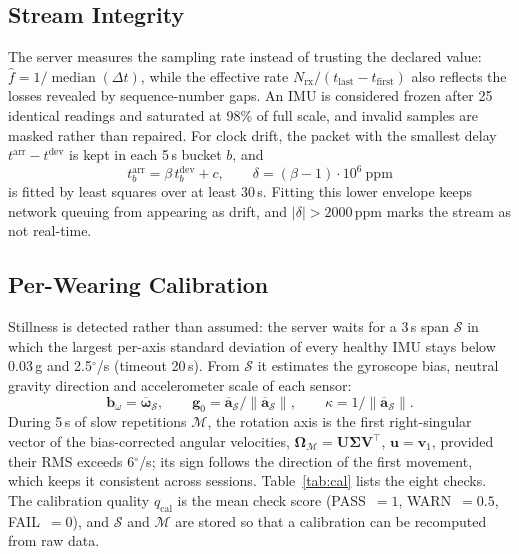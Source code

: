 \documentclass[conference]{IEEEtran}
\newcommand{\vect}[1]{\mathbf{#1}}
\begin{document}
\subsection{Stream Integrity}
The server measures the sampling rate instead of trusting the declared value: $\hat f=1/\operatorname{median}(\Delta t)$, while the effective rate $N_{\mathrm{rx}}/(t_{\mathrm{last}}-t_{\mathrm{first}})$ also reflects the losses revealed by sequence-number gaps. An IMU is considered frozen after 25 identical readings and saturated at 98\% of full scale, and invalid samples are masked rather than repaired. For clock drift, the packet with the smallest delay $t^{\mathrm{arr}}-t^{\mathrm{dev}}$ is kept in each 5\,s bucket $b$, and
\begin{equation}
t^{\mathrm{arr}}_b=\beta\,t^{\mathrm{dev}}_b+c,\qquad \delta=(\beta-1)\cdot10^{6}\ \text{ppm}
\label{eq:drift}
\end{equation}
is fitted by least squares over at least 30\,s. Fitting this lower envelope keeps network queuing from appearing as drift, and $\lvert\delta\rvert>2000$\,ppm marks the stream as not real-time.

\subsection{Per-Wearing Calibration}
Stillness is detected rather than assumed: the server waits for a 3\,s span $\mathcal{S}$ in which the largest per-axis standard deviation of every healthy IMU stays below 0.03\,g and 2.5$^\circ$/s (timeout 20\,s). From $\mathcal{S}$ it estimates the gyroscope bias, neutral gravity direction and accelerometer scale of each sensor:
\begin{equation}
\vect{b}_\omega=\overline{\boldsymbol{\omega}}_{\mathcal{S}},\qquad \vect{g}_0=\overline{\vect{a}}_{\mathcal{S}}/\lVert\overline{\vect{a}}_{\mathcal{S}}\rVert,\qquad \kappa=1/\lVert\overline{\vect{a}}_{\mathcal{S}}\rVert .
\label{eq:cal}
\end{equation}
During 5\,s of slow repetitions $\mathcal{M}$, the rotation axis is the first right-singular vector of the bias-corrected angular velocities, $\boldsymbol{\Omega}_{\mathcal{M}}=\vect{U}\boldsymbol{\Sigma}\vect{V}^{\top}$, $\vect{u}=\vect{v}_1$, provided their RMS exceeds 6$^\circ$/s; its sign follows the direction of the first movement, which keeps it consistent across sessions. Table~\ref{tab:cal} lists the eight checks. The calibration quality $q_{\mathrm{cal}}$ is the mean check score (PASS~$=1$, WARN~$=0.5$, FAIL~$=0$), and $\mathcal{S}$ and $\mathcal{M}$ are stored so that a calibration can be recomputed from raw data.
\end{document}
